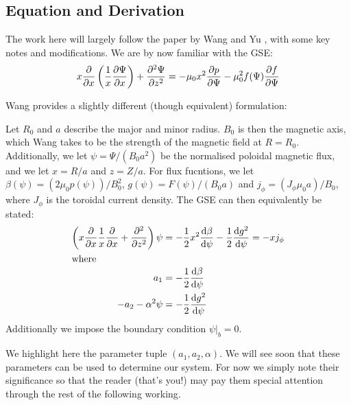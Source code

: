 \subsection{Equation and Derivation}

The work here will largely follow the paper by Wang and Yu \cite{wang-analytic-solution},
with some key notes and modifications. We are by now familiar with the GSE:
\begin{equation}
    x \pdv{x} \left ( \frac{1}{x} \pdv{\Psi}{x} \right ) + \pdv[2]{\Psi}{z} = -\mu_0 x^2 \pdv{p}{\Psi} - \mu_0^2 f(\Psi) \pdv{f}{\Psi}
\end{equation}

Wang provides a slightly different (though equivalent) formulation:
\begin{proposition}
    Let $R_0$ and $a$ describe the major and minor radius. $B_0$ is then the magnetic axis, which Wang takes to be 
    the strength of the magnetic field at $R = R_0$. Additionally, we let $\psi = \Psi / (B_0 a^2)$ be the 
    normalised poloidal magnetic flux, and we let $x = R/a$ and $z = Z/a$. For flux fucntions, we let $\beta(\psi) = (2 \mu_0 p(\psi))/B_0^2$, 
    $g(\psi) = F(\psi) / (B_0 a)$ and $j_\phi = (J_{\phi} \mu_0 a) / B_0$, where $J_{\phi}$ is the toroidal current density. 
    The GSE can then equivalently be stated:
    \begin{align}
        \label{wang-gse} \left ( x \pdv{x} \frac{1}{x} \pdv{x} + \pdv[2]{z} \right ) \psi &= -\frac{1}{2} x^2 \dv{\beta}{\psi} - \frac{1}{2}\dv{g^2}{\psi} = -x j_{\phi} \\
        \intertext{where}
        \label{a1} a_1 &= -\frac{1}{2} \dv{\beta}{\psi} \\
        \label{a2-alpha} -a_2 - \alpha^2 \psi &= -\frac{1}{2} \dv{g^2}{\psi}
    \end{align}
    Additionally we impose the boundary condition $\psi |_b = 0$. 
\end{proposition} 

\begin{remark}
    We highlight here the parameter tuple $(a_1, a_2, \alpha)$. We will see soon that 
    these parameters can be used to determine our system. For now we simply note their 
    significance so that the reader (that's you!) may pay them special attention through the rest of the following working.
\end{remark}

